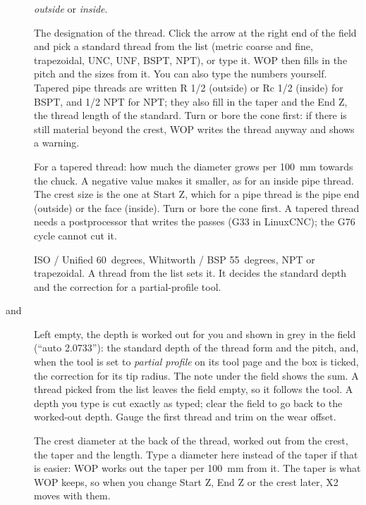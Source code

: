 \begin{description}
\item[] \emph{outside} or \emph{inside}.
\item[] The designation of the thread. Click the arrow at the right end of the field and pick a standard thread from the list (metric coarse and fine, trapezoidal, UNC, UNF, BSPT, NPT), or type it. WOP then fills in the pitch and the sizes from it. You can also type the numbers yourself. Tapered pipe threads are written R 1/2 (outside) or Rc 1/2 (inside) for BSPT, and 1/2 NPT for NPT; they also fill in the taper and the End Z, the thread length of the standard. Turn or bore the cone first: if there is still material beyond the crest, WOP writes the thread anyway and shows a warning.
\item[] For a tapered thread: how much the diameter grows per 100~mm towards the chuck. A negative value makes it smaller, as for an inside pipe thread. The crest size is the one at Start Z, which for a pipe thread is the pipe end (outside) or the face (inside). Turn or bore the cone first. A tapered thread needs a postprocessor that writes the passes (G33 in LinuxCNC); the G76 cycle cannot cut it.
\item[] ISO / Unified 60~degrees, Whitworth / BSP 55~degrees, NPT or trapezoidal. A thread from the list sets it. It decides the standard depth and the correction for a partial-profile tool.
\item[ and ] Left empty, the depth is worked out for you and shown in grey in the field (``auto 2.0733''): the standard depth of the thread form and the pitch, and, when the tool is set to \emph{partial profile} on its tool page and the box is ticked, the correction for its tip radius. The note under the field shows the sum. A thread picked from the list leaves the field empty, so it follows the tool. A depth you type is cut exactly as typed; clear the field to go back to the worked-out depth. Gauge the first thread and trim on the wear offset.
\item[] The crest diameter at the back of the thread, worked out from the crest, the taper and the length. Type a diameter here instead of the taper if that is easier: WOP works out the taper per 100~mm from it. The taper is what WOP keeps, so when you change Start Z, End Z or the crest later, X2 moves with them.

\end{description}
